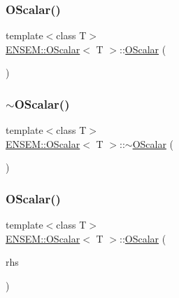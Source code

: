 \subsubsection{\texorpdfstring{OScalar()}{OScalar()}\hspace{0.1cm}{\footnotesize\ttfamily [1/12]}}
{\footnotesize\ttfamily template$<$class T$>$ \\
\mbox{\hyperlink{classENSEM_1_1OScalar}{E\+N\+S\+E\+M\+::\+O\+Scalar}}$<$ T $>$\+::\mbox{\hyperlink{classENSEM_1_1OScalar}{O\+Scalar}} (\begin{DoxyParamCaption}{ }\end{DoxyParamCaption})\hspace{0.3cm}{\ttfamily [inline]}}

\mbox{\label{classENSEM_1_1OScalar_ac08c93c225f24926096565485406c529}} 
\subsubsection{\texorpdfstring{$\sim$OScalar()}{~OScalar()}\hspace{0.1cm}{\footnotesize\ttfamily [1/2]}}
{\footnotesize\ttfamily template$<$class T$>$ \\
\mbox{\hyperlink{classENSEM_1_1OScalar}{E\+N\+S\+E\+M\+::\+O\+Scalar}}$<$ T $>$\+::$\sim$\mbox{\hyperlink{classENSEM_1_1OScalar}{O\+Scalar}} (\begin{DoxyParamCaption}{ }\end{DoxyParamCaption})\hspace{0.3cm}{\ttfamily [inline]}}

\mbox{\label{classENSEM_1_1OScalar_a62bd0b52eff623c7e4911aa896c97ccf}} 
\subsubsection{\texorpdfstring{OScalar()}{OScalar()}\hspace{0.1cm}{\footnotesize\ttfamily [2/12]}}
{\footnotesize\ttfamily template$<$class T$>$ \\
\mbox{\hyperlink{classENSEM_1_1OScalar}{E\+N\+S\+E\+M\+::\+O\+Scalar}}$<$ T $>$\+::\mbox{\hyperlink{classENSEM_1_1OScalar}{O\+Scalar}} (\begin{DoxyParamCaption}\item[{const typename \mbox{\hyperlink{structENSEM_1_1WordType}{Word\+Type}}$<$ T $>$\+::Type\+\_\+t \&}]{rhs }\end{DoxyParamCaption})\hspace{0.3cm}{\ttfamily [inline]}}



